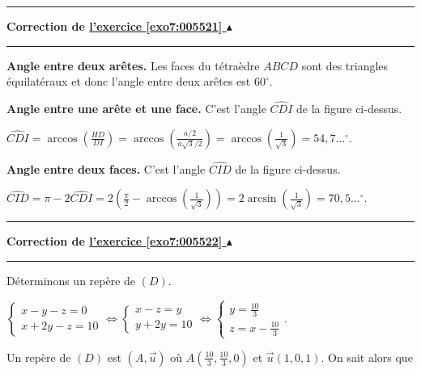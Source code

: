 \documentclass[11pt,a4paper]{article}
\newcommand{\Arcsin}{\mathop{\mathrm{arcsin}}\nolimits}
\newcommand{\Arccos}{\mathop{\mathrm{arccos}}\nolimits}
\newcounter{exo}
\newcommand{\correction}[1]{\hypertarget{cor7:#1}{}\label{cor7:#1}{\bf Correction de \hyperlink{exo7:#1}{l'exercice \ref{exo7:#1} $\blacktriangle$}}\vspace{1mm}\hrule\vspace{1mm}}
\newcommand{\fincorrection}{\vspace{1mm}\hrule\vspace*{7mm}}
\begin{document}
\begin{center}
\end{center}
\fincorrection
\correction{005521}





\textbf{Angle entre deux arêtes.} Les faces du tétraèdre $ABCD$ sont des triangles équilatéraux et donc l'angle entre deux arêtes est $60^\circ$.


\textbf{Angle entre une  arête et une face.} C'est l'angle $\widehat{CDI}$ de la figure ci-dessus.

\begin{center}
$\widehat{CDI}=\Arccos\left(\frac{HD}{DI}\right)=\Arccos\left(\frac{a/2}{a\sqrt{3}/2}\right)=\Arccos\left(\frac{1}{\sqrt{3}}\right)=54,7\ldots^\circ$.
\end{center}
\textbf{Angle entre deux faces.} C'est l'angle $\widehat{CID}$ de la figure ci-dessus.

\begin{center}
$\widehat{CID}=\pi-2\widehat{CDI}=2\left(\frac{\pi}{2}-\Arccos\left(\frac{1}{\sqrt{3}}\right)\right)=2\Arcsin\left(\frac{1}{\sqrt{3}}\right)=70,5\ldots^\circ$.
\end{center}
\fincorrection
\correction{005522}
Déterminons un repère de $(D)$.

\begin{center}
$\left\{
\begin{array}{l}
x-y-z=0\\
x+2y-z=10
\end{array}
\right.\Leftrightarrow\left\{
\begin{array}{l}
x-z=y\\
y+2y=10
\end{array}
\right.\Leftrightarrow\left\{
\begin{array}{l}
y=\frac{10}{3}\\
z=x-\frac{10}{3}
\end{array}
\right.$.
\end{center}
Un repère de $(D)$ est $\left(A,\overrightarrow{u}\right)$ où $A\left(\frac{10}{3},\frac{10}{3},0\right)$ et $\overrightarrow{u}(1,0,1)$.
On sait alors que
\end{document}
